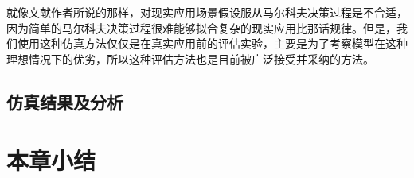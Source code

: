 就像文献\citep{pednault2002sequential}作者所说的那样，对现实应用场景假设服从马尔科夫决策过程是不合适，因为简单的马尔科夫决策过程很难能够拟合复杂的现实应用比那话规律。但是，我们使用这种仿真方法仅仅是在真实应用前的评估实验，主要是为了考察模型在这种理想情况下的优劣，所以这种评估方法也是目前被广泛接受并采纳的方法。

\subsection{仿真结果及分析}

\section{本章小结}

 